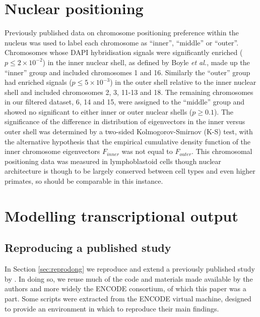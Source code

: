 \documentclass[a4paper,11pt,oneside]{book}
\begin{document}
\section{Nuclear positioning}\label{methods:positioning}
Previously published data  on chromosome positioning preference within
the nucleus was used to label each chromosome as ``inner'', ``middle''
or ``outer''.\cite{Boyle2001} Chromosomes whose DAPI hybridisation
signals were significantly enriched ($p\leq 2\times10^{-2}$) in the inner nuclear shell, as
defined by Boyle \emph{et al.}\cite{Boyle2001}, made up the ``inner''
group and included chromosomes 1 and 16. Similarly the ``outer'' group
had enriched signals ($p\leq 5\times10^{-3}$) in the outer shell relative to the inner nuclear
shell and included chromosomes 2, 3, 11-13 and 18. The remaining
chromosomes in our filtered dataset, 6, 14 and 15, were assigned to
the ``middle'' group and showed no significant to either inner or
outer nuclear shells ($p \geq 0.1$).\cite{Boyle2001} The significance
of the difference in distribution of eigenvectors in the inner
versus outer shell was determined by a two-sided Kolmogorov-Smirnov (K-S)
test, with the alternative hypothesis that the empirical cumulative
density function of the inner chromosome eigenvectors $F_{inner}$ was not equal to $F_{outer}$. This chromosomal positioning data was measured in lymphoblastoid
cells though nuclear architecture is though to be largely conserved
between cell types\cite{Chambers2013, DeWit2013} and even higher primates,\cite{Tanabe2002} so should be comparable in this instance.

\section{Modelling transcriptional output}

\subsection{Reproducing a published study}\label{meth:dong}
In Section \ref{sec:reprodong} we reproduce and extend a previously published study by \citet{Dong2012}. In doing so, we reuse much of the code and materials made available by the authors and more widely the ENCODE consortium\cite{Dunham2012}, of which this paper was a part. Some scripts were extracted from the ENCODE virtual machine, designed to provide an environment in which to reproduce their main findings.\cite{Myers2011}
\end{document}
